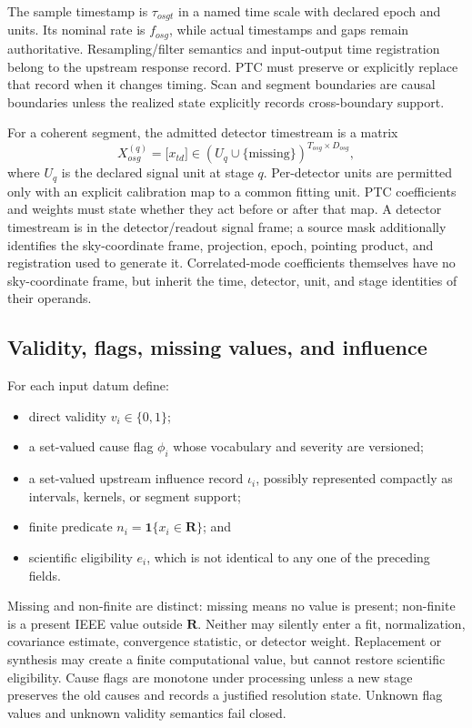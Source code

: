 \documentclass[11pt]{article}
\newcommand{\R}{\mathbf{R}}
\begin{document}
The sample timestamp is $\tau_{osgt}$ in a named time scale with declared
epoch and units.  Its nominal rate is $f_{osg}$, while actual timestamps and
gaps remain authoritative.  Resampling/filter semantics and input-output time
registration belong to the upstream response record.  PTC must preserve or
explicitly replace that record when it changes timing.  Scan and segment
boundaries are causal boundaries unless the realized state explicitly records
cross-boundary support.

For a coherent segment, the admitted detector timestream is a matrix
\begin{equation}
 X^{(q)}_{osg}=\bigl[x_{td}\bigr]
 \in (U_q\cup\{\mathrm{missing}\})^{T_{osg}\times D_{osg}},
 \label{eq:input-shape}
\end{equation}
where $U_q$ is the declared signal unit at stage $q$.  Per-detector units are
permitted only with an explicit calibration map to a common fitting unit.
PTC coefficients and weights must state whether they act before or after that
map.  A detector timestream is in the detector/readout signal frame; a source
mask additionally identifies the sky-coordinate frame, projection, epoch,
pointing product, and registration used to generate it.  Correlated-mode
coefficients themselves have no sky-coordinate frame, but inherit the time,
detector, unit, and stage identities of their operands.

\subsection{Validity, flags, missing values, and influence}

For each input datum define:
\begin{itemize}[leftmargin=*]
  \item direct validity $v_i\in\{0,1\}$;
  \item a set-valued cause flag $\phi_i$ whose vocabulary and severity are
  versioned;
  \item a set-valued upstream influence record $\iota_i$, possibly represented
  compactly as intervals, kernels, or segment support;
  \item finite predicate $n_i=\mathbf 1\{x_i\in\R\}$; and
  \item scientific eligibility $e_i$, which is not identical to any one of
  the preceding fields.
\end{itemize}
Missing and non-finite are distinct: missing means no value is present;
non-finite is a present IEEE value outside $\R$.  Neither may silently enter a
fit, normalization, covariance estimate, convergence statistic, or detector
weight.  Replacement or synthesis may create a finite computational value,
but cannot restore scientific eligibility.  Cause flags are monotone under
processing unless a new stage preserves the old causes and records a justified
resolution state.  Unknown flag values and unknown validity semantics fail
closed.
\end{document}

